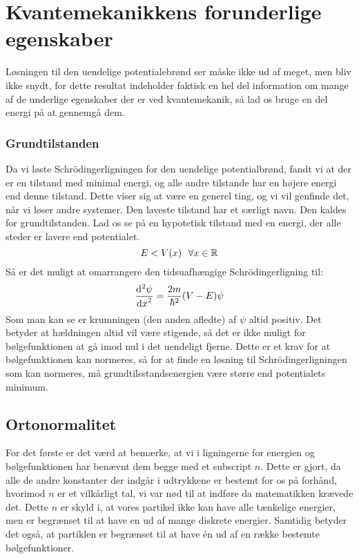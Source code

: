 \documentclass[../Kvantemekanik.tex]{subfiles}
\begin{document}
\section{Kvantemekanikkens forunderlige egenskaber}
Løsningen til den uendelige potentialebrønd ser måske ikke ud af meget, men bliv ikke snydt, for dette resultat indeholder faktisk en hel del information om mange af de underlige egenskaber der er ved kvantemekanik, så lad os bruge en del energi på at gennemgå dem.

\subsubsection{Grundtilstanden}
Da vi løste Schrödingerligningen for den uendelige potentialbrønd, fandt vi at der er en tilstand med minimal energi, og alle andre tilstande har en højere energi end denne tilstand.
Dette viser sig at være en generel ting, og vi vil genfinde det, når vi løser andre systemer.
Den laveste tilstand har et særligt navn. Den kaldes for grundtilstanden. 
Lad os se på en hypotetisk tilstand med en energi, der alle steder er lavere end potentialet.
$$
E<V(x)~~\forall x\in \R
$$
Så er det muligt at omarrangere den tidsuafhængige Schrödingerligning til:
\begin{equation}
    \dif[2]{x}{\psi} = \frac{2m}{\hbar^2}(V-E)\psi
\end{equation}
Som man kan se er krumningen (den anden afledte) af $\psi$ altid positiv. Det betyder at hældningen altid vil være stigende, så det er ikke muligt for bølgefunktionen at gå imod nul i det uendeligt fjerne. Dette er et krav for at bølgefunktionen kan normeres, så for at finde en løsning til Schrödingerligningen som kan normeres, må grundtilsstandsenergien være større end potentialets minimum.

\subsection{Ortonormalitet}
For det første er det værd at bemærke, at vi i ligningerne for energien og bølgefunktionen har benævnt dem begge med et subscript $n$. Dette er gjort, da alle de andre konstanter der indgår i udtrykkene er bestemt for os på forhånd, hvorimod $n$ er et vilkårligt tal, vi var nød til at indføre da matematikken krævede det. Dette $n$ er skyld i, at vores partikel ikke kan have alle tænkelige energier, men er begrænset til at have en ud af mange diskrete energier. Samtidig betyder det også, at partiklen er begrænset til at have én ud af en række bestemte bølgefunktioner.
\end{document}
